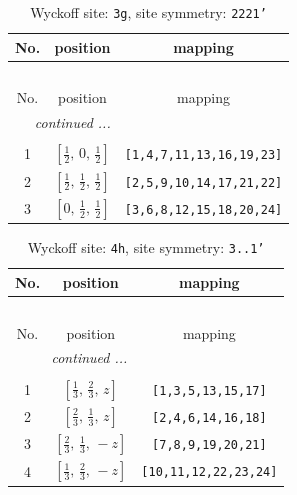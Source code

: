 \documentclass[fleqn,8pt]{jsarticle}
\begin{document}
\begin{longtable}{ccc}
\caption{Wyckoff site: {\tt 3g}, site symmetry: {\tt 2221'}}
 \\
 \hline \hline
No. & position & mapping \\ \hline \endfirsthead

\multicolumn{2}{l}{\tablename\ \thetable{}} \\
 \hline \hline
No. & position & mapping \\ \hline \endhead

 \hline \hline
\multicolumn{2}{r}{\footnotesize\it continued ...} \\ \endfoot

 \hline \hline
\multicolumn{2}{r}{} \\ \endlastfoot

1 & $\left[ \frac{1}{2},\, 0,\, \frac{1}{2} \right]$ & {\tt [1,4,7,11,13,16,19,23]} \\ \hline
2 & $\left[ \frac{1}{2},\, \frac{1}{2},\, \frac{1}{2} \right]$ & {\tt [2,5,9,10,14,17,21,22]} \\ \hline
3 & $\left[ 0,\, \frac{1}{2},\, \frac{1}{2} \right]$ & {\tt [3,6,8,12,15,18,20,24]} \\
\end{longtable}
\renewcommand{\arraystretch}{1.2}
\begin{longtable}{ccc}
\caption{Wyckoff site: {\tt 4h}, site symmetry: {\tt 3..1'}}
 \\
 \hline \hline
No. & position & mapping \\ \hline \endfirsthead

\multicolumn{2}{l}{\tablename\ \thetable{}} \\
 \hline \hline
No. & position & mapping \\ \hline \endhead

 \hline \hline
\multicolumn{2}{r}{\footnotesize\it continued ...} \\ \endfoot

 \hline \hline
\multicolumn{2}{r}{} \\ \endlastfoot

1 & $\left[ \frac{1}{3},\, \frac{2}{3},\, z \right]$ & {\tt [1,3,5,13,15,17]} \\ \hline
2 & $\left[ \frac{2}{3},\, \frac{1}{3},\, z \right]$ & {\tt [2,4,6,14,16,18]} \\ \hline
3 & $\left[ \frac{2}{3},\, \frac{1}{3},\, - z \right]$ & {\tt [7,8,9,19,20,21]} \\ \hline
4 & $\left[ \frac{1}{3},\, \frac{2}{3},\, - z \right]$ & {\tt [10,11,12,22,23,24]} \\
\end{longtable}
\end{document}
